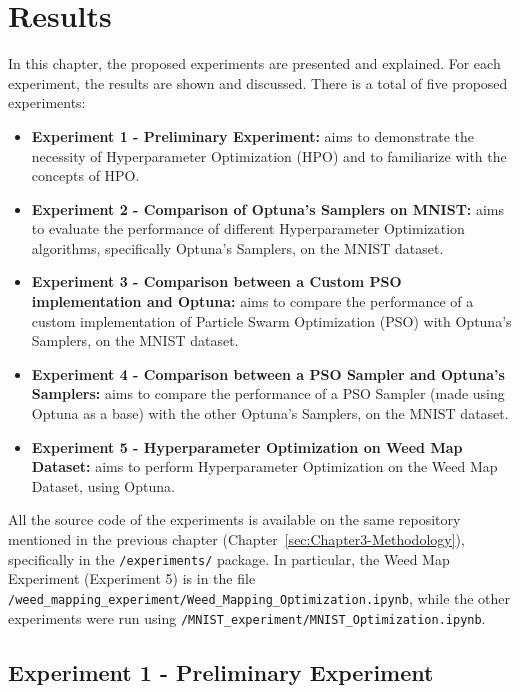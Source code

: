 \chapter{Results}\label{sec:Chapter4-Results}

In this chapter, the proposed experiments are presented and explained. For each experiment, the results are shown and discussed.
There is a total of five proposed experiments:
\begin{itemize}[itemsep=0.1cm]
    \item \textbf{Experiment 1 - Preliminary Experiment:} aims to demonstrate the necessity of Hyperparameter Optimization (HPO) and to familiarize with the concepts of HPO.
    \item \textbf{Experiment 2 - Comparison of Optuna's Samplers on MNIST:} aims to evaluate the performance of different Hyperparameter Optimization algorithms, specifically Optuna's Samplers, on the MNIST dataset.
    \item \textbf{Experiment 3 - Comparison between a Custom PSO implementation and Optuna:} aims to compare the performance of a custom implementation of Particle Swarm Optimization (PSO) with Optuna's Samplers, on the MNIST dataset.
    \item \textbf{Experiment 4 - Comparison between a PSO Sampler and Optuna's Samplers:} aims to compare the performance of a PSO Sampler (made using Optuna as a base) with the other Optuna's Samplers, on the MNIST dataset.
    \item \textbf{Experiment 5 - Hyperparameter Optimization on Weed Map Dataset:} aims to perform Hyperparameter Optimization on the Weed Map Dataset, using Optuna.
\end{itemize}

All the source code of the experiments is available on the same repository \cite{Repository-THESIS} mentioned in the previous chapter (Chapter~\ref{sec:Chapter3-Methodology}), specifically in the \texttt{/experiments/} package.
In particular, the Weed Map Experiment (Experiment 5) is in the file \newline\texttt{/weed\_mapping\_experiment/Weed\_Mapping\_Optimization.ipynb}, while the other experiments were run using \texttt{/MNIST\_experiment/MNIST\_Optimization.ipynb}.

\section{Experiment 1 - Preliminary Experiment}

